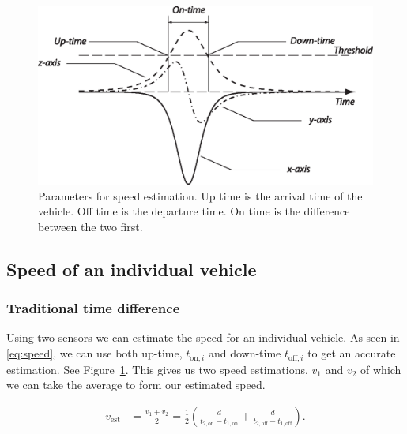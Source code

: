 \begin{figure}[!htbf]
 \centering
 \begin{minipage}{0.6\linewidth}
 \includegraphics[width=1\linewidth]{images/ontime.eps}
 \caption[Parameters for speed estimation]{Parameters for speed estimation. Up time is the arrival time of the vehicle. Off time is the departure time. On time is the difference between the two first.}
 \label{fig:ontime}
 \end{minipage}
\end{figure}

\subsection{Speed of an individual vehicle}
\subsubsection{Traditional time difference}
Using two sensors we can estimate the speed for an individual vehicle. As seen in \eqref{eq:speed}, we can use both up-time, $t_{\text{on},i}$ and down-time $t_{\text{off},i}$ to get an accurate estimation. See Figure~\ref{fig:ontime}. This gives us two speed estimations, $v_1$ and $v_2$ of which we can take the average to form our estimated speed.

\begin{align}
 v_{\text{est}} &= \frac{v_1 + v_2}{2} = \frac{1}{2}\left(\frac{d}{t_{2,\text{on}}-t_{1,\text{on}}} + \frac{d}{t_{2,\text{off}} - t_{1,\text{off}}}\right).
 \label{eq:speed}
 \end{align}


